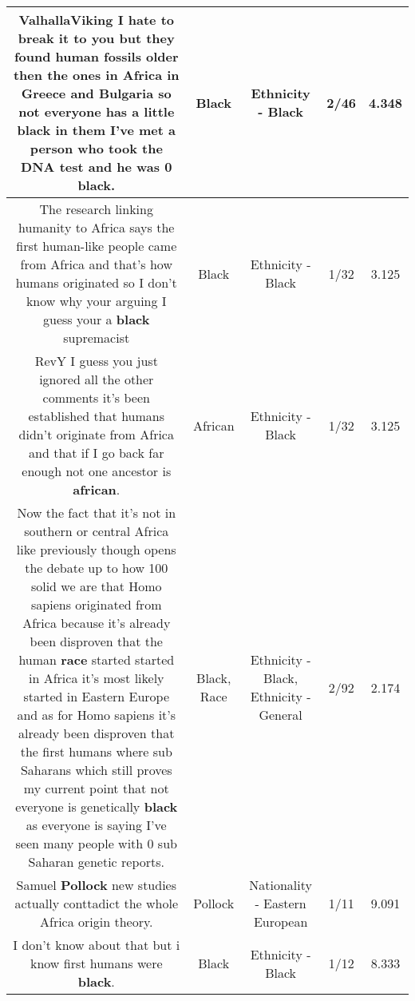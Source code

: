 \documentclass[11pt]{article}
\newlength\mylength
\begin{document}
\begin{center}
\begin{longtable}{|C{.65\mylength}|C{.30\mylength}|C{.12\mylength}|C{.12\mylength}|C{.12\mylength}|}
  \small ValhallaViking I hate to break it to you but they found human fossils older then the ones in Africa in Greece and Bulgaria so not everyone has a little \textbf{black} in them I've met a person who took the DNA test and he was 0 \textbf{black}.\normalsize   & Black & Ethnicity - Black & 2/46 & 4.348 \\  \hline
  \small The research linking humanity to Africa says the first human-like people came from Africa and that's how humans originated so I don't know why your arguing I guess your a \textbf{black} supremacist\normalsize   & Black & Ethnicity - Black & 1/32 & 3.125 \\  \hline
  \small RevY I guess you just ignored all the other comments it's been established that humans didn't originate from Africa and that if I go back far enough not one ancestor is \textbf{african}.\normalsize   & African & Ethnicity - Black & 1/32 & 3.125 \\  \hline
  \small Now the fact that it's not in southern or central Africa like previously though opens the debate up to how 100 solid we are that Homo sapiens originated from Africa because it's already been disproven that the human \textbf{race} started started in Africa it's most likely started in Eastern Europe and as for Homo sapiens it's already been disproven that the first humans where sub Saharans which still proves my current point that not everyone is genetically \textbf{black} as everyone is saying I've seen many people with 0 sub Saharan genetic reports.\normalsize   & Black, Race & Ethnicity - Black, Ethnicity - General & 2/92 & 2.174 \\  \hline
  \small Samuel \textbf{Pollock} new studies actually conttadict the whole Africa origin theory.\normalsize   & Pollock & Nationality - Eastern European & 1/11 & 9.091 \\  \hline
  \small I don't know about that but i know first humans were \textbf{black}.\normalsize   & Black & Ethnicity - Black & 1/12 & 8.333 \\  \hline

\end{longtable}
\end{center}
\end{document}
